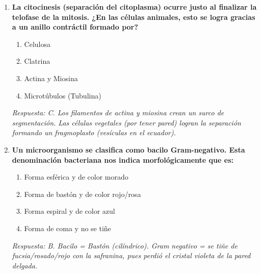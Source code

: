\documentclass[spanish,letterpaper,oneside]{article}
\begin{document}
\begin{enumerate}[label=\textbf{\arabic*.}]
    \item \textbf{La citocinesis (separación del citoplasma) ocurre justo al finalizar la telofase de la mitosis. ¿En las células animales, esto se logra gracias a un anillo contráctil formado por?}
    \begin{enumerate}
        \item[A)] Celulosa
        \item[B)] Clatrina
        \item[C)] Actina y Miosina
        \item[D)] Microtúbulos (Tubulina)
    \end{enumerate}
    \textit{Respuesta: C. Los filamentos de actina y miosina crean un surco de segmentación. Las células vegetales (por tener pared) logran la separación formando un fragmoplasto (vesículas en el ecuador).}

    \item \textbf{Un microorganismo se clasifica como bacilo Gram-negativo. Esta denominación bacteriana nos indica morfológicamente que es:}
    \begin{enumerate}
        \item[A)] Forma esférica y de color morado
        \item[B)] Forma de bastón y de color rojo/rosa
        \item[C)] Forma espiral y de color azul
        \item[D)] Forma de coma y no se tiñe
    \end{enumerate}
    \textit{Respuesta: B. Bacilo = Bastón (cilíndrico). Gram negativo = se tiñe de fucsia/rosado/rojo con la safranina, pues perdió el cristal violeta de la pared delgada.}

\end{enumerate}
\end{document}
